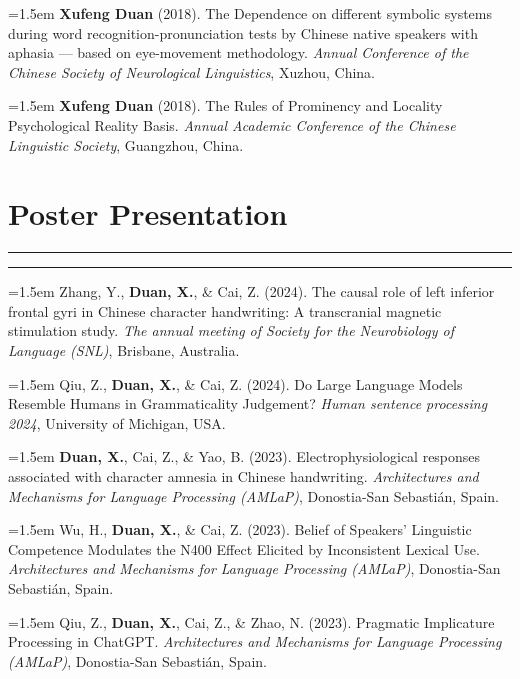 \documentclass[11pt,a4paper]{article}
\begin{document}
\hangindent=1.5em  \textbf{Xufeng Duan} (2018). The Dependence on different symbolic systems during word recognition-pronunciation tests by Chinese native speakers with aphasia — based on eye-movement methodology. \textit{Annual Conference of the Chinese Society of Neurological Linguistics}, Xuzhou, China.

\hangindent=1.5em  \textbf{Xufeng Duan} (2018). The Rules of Prominency and Locality Psychological Reality Basis. \textit{Annual Academic Conference of the Chinese Linguistic Society}, Guangzhou, China.

\vspace{-1.2em} 
\section*{Poster Presentation}
\vspace{-.5em} 
\hrule
\vspace{0.3ex}
\hrule

\hangindent=1.5em  Zhang, Y., \textbf{Duan, X.}, \& Cai, Z. (2024). The causal role of left inferior frontal gyri in Chinese character handwriting: A transcranial magnetic stimulation study. \textit{The annual meeting of Society for the Neurobiology of Language (SNL)}, Brisbane, Australia.

\hangindent=1.5em  Qiu, Z., \textbf{Duan, X.}, \& Cai, Z. (2024). Do Large Language Models Resemble Humans in Grammaticality Judgement? \textit{Human sentence processing 2024}, University of Michigan, USA.

\hangindent=1.5em  \textbf{Duan, X.}, Cai, Z., \& Yao, B. (2023). Electrophysiological responses associated with character amnesia in Chinese handwriting. \textit{Architectures and Mechanisms for Language Processing (AMLaP)}, Donostia-San Sebastián, Spain.

\hangindent=1.5em  Wu, H., \textbf{Duan, X.}, \& Cai, Z. (2023). Belief of Speakers’ Linguistic Competence Modulates the N400 Effect Elicited by Inconsistent Lexical Use. \textit{Architectures and Mechanisms for Language Processing (AMLaP)}, Donostia-San Sebastián, Spain.

\hangindent=1.5em  Qiu, Z., \textbf{Duan, X.}, Cai, Z., \& Zhao, N. (2023). Pragmatic Implicature Processing in ChatGPT. \textit{Architectures and Mechanisms for Language Processing (AMLaP)}, Donostia-San Sebastián, Spain.
\end{document}

